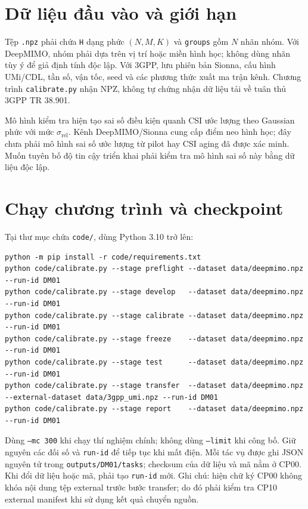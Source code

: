 \documentclass[11pt,onecolumn]{IEEEtran}
\begin{document}
\section{Dữ liệu đầu vào và giới hạn}
Tệp \texttt{.npz} phải chứa \texttt{H} dạng phức $(N,M,K)$ và \texttt{groups} gồm $N$ nhãn nhóm. Với DeepMIMO, nhóm phải dựa trên vị trí hoặc miền hình học; không dùng nhãn tùy ý để giả định tính độc lập. Với 3GPP, lưu phiên bản Sionna, cấu hình UMi/CDL, tần số, vận tốc, seed và các phương thức xuất ma trận kênh. Chương trình \texttt{calibrate.py} nhận NPZ, không tự chứng nhận dữ liệu tải về tuân thủ 3GPP TR 38.901.

Mô hình kiểm tra hiện tạo sai số điều kiện quanh CSI ước lượng theo Gaussian phức với mức $\sigma_{\mathrm{rel}}$. Kênh DeepMIMO/Sionna cung cấp điểm neo hình học; đây chưa phải mô hình sai số ước lượng từ pilot hay CSI aging đã được xác minh. Muốn tuyên bố độ tin cậy triển khai phải kiểm tra mô hình sai số này bằng dữ liệu độc lập.

\section{Chạy chương trình và checkpoint}
Tại thư mục chứa \texttt{code/}, dùng Python 3.10 trở lên:
\begin{verbatim}
python -m pip install -r code/requirements.txt
python code/calibrate.py --stage preflight --dataset data/deepmimo.npz --run-id DM01
python code/calibrate.py --stage develop   --dataset data/deepmimo.npz --run-id DM01
python code/calibrate.py --stage calibrate --dataset data/deepmimo.npz --run-id DM01
python code/calibrate.py --stage freeze    --dataset data/deepmimo.npz --run-id DM01
python code/calibrate.py --stage test      --dataset data/deepmimo.npz --run-id DM01
python code/calibrate.py --stage transfer  --dataset data/deepmimo.npz --external-dataset data/3gpp_umi.npz --run-id DM01
python code/calibrate.py --stage report    --dataset data/deepmimo.npz --run-id DM01
\end{verbatim}
Dùng \texttt{--mc 300} khi chạy thí nghiệm chính; không dùng \texttt{--limit} khi công bố. Giữ nguyên các đối số và \texttt{run-id} để tiếp tục khi mất điện. Mỗi tác vụ được ghi JSON nguyên tử trong \texttt{outputs/DM01/tasks}; checksum của dữ liệu và mã nằm ở CP00. Khi đổi dữ liệu hoặc mã, phải tạo \texttt{run-id} mới. Ghi chú: hiện chữ ký CP00 không khóa nội dung tệp external trước bước transfer; do đó phải kiểm tra CP10 external manifest khi sử dụng kết quả chuyển nguồn.
\end{document}
